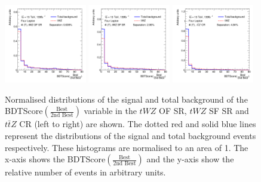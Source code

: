 \begin{figure}[h!]
    \centering
    \includegraphics[width=0.32\textwidth]{figures/bdtPlots/lep4_tWZ_4T_OF_BDT_Score_bestOver2ndBest_noExclusion.png}
    \includegraphics[width=0.32\textwidth]{figures/bdtPlots/lep4_tWZ_4T_SF_BDT_Score_bestOver2ndBest_noExclusion.png}
    \includegraphics[width=0.32\textwidth]{figures/bdtPlots/lep4_ttZ_4T_BDT_Score_bestOver2ndBest_noExclusion.png}
    \caption{Normalised distributions of the signal and total background of the BDTScore$(\frac{\text{Best}}{\text{2nd Best}})$ variable in the $tWZ$ OF SR, $tWZ$ SF SR and $t\bar{t}Z$ CR (left to right) are shown. The dotted red and solid blue lines represent the distributions of the signal and total background events respectively. These histograms are normalised to an area of 1. The x-axis shows the BDTScore$(\frac{\text{Best}}{\text{2nd Best}})$ and the y-axis show the relative number of events in arbitrary units.}
    \label{fig:bdtscore-bestover2ndbest}

\end{figure}
